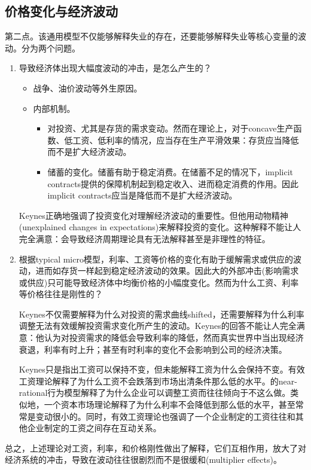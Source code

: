 \subsection{价格变化与经济波动}
\label{sec:KNK-prices-fluctuations}
第二点。该通用模型不仅能够解释失业的存在，还要能够解释失业等核心变量的波动。分为两个问题。
\begin{enumerate}
\item 导致经济体出现大幅度波动的冲击，是怎么产生的？
\begin{itemize}
\item 战争、油价波动等外生原因。
\item 内部机制。
\begin{itemize}
\item 对投资、尤其是存货的需求变动。然而在理论上，对于concave生产函数、低工资、低利率的情况，应当存在生产平滑效果：存货应当降低而不是扩大经济波动。
\item 储蓄的变化。储蓄有助于稳定消费。在储蓄不足的情况下，implicit contracts提供的保障机制起到稳定收入、进而稳定消费的作用。因此implicit contracts应当是降低而不是扩大经济波动。
\end{itemize}
\end{itemize}
Keynes正确地强调了投资变化对理解经济波动的重要性。但他用动物精神(unexplained changes in expectations)来解释投资的变化。这种解释不能让人完全满意：会导致经济周期理论具有无法解释甚至是非理性的特征。
\item 根据typical micro模型，利率、工资等价格的变化有助于缓解需求或供应的波动，进而如存货一样起到稳定经济波动的效果。因此大的外部冲击(影响需求或供应)只可能导致经济体中均衡价格的小幅度变化。然而为什么工资、利率等价格往往是刚性的？

Keynes不仅需要解释为什么对投资的需求曲线shifted，还需要解释为什么利率调整无法有效缓解投资需求变化所产生的波动。Keynes的回答不能让人完全满意：他认为对投资需求的降低会导致利率的降低，然而真实世界中当出现经济衰退，利率有时上升；甚至有时利率的变化不会影响到公司的经济决策。

Keynes只是指出工资可以保持不变，但未能解释工资为什么会保持不变。有效工资理论解释了为什么工资不会跌落到市场出清条件那么低的水平。\cite{Akerlof:1985ku}的near-rational行为模型解释了为什么企业可以调整工资而往往倾向于不这么做。类似地，一个资本市场理论解释了为什么利率不会降低到那么低的水平\citep{Stiglitz:1981ej,Stiglitz:1983jm,Stiglitz:2009gv}，甚至常常是变动很小的。同时，有效工资理论也强调了一个企业制定的工资往往和其他企业制定的工资之间存在互动关系。
\end{enumerate}

总之，上述理论对工资，利率，和价格刚性做出了解释，它们互相作用，放大了对经济系统的冲击，导致在波动往往很剧烈而不是很缓和(multiplier effects)。

